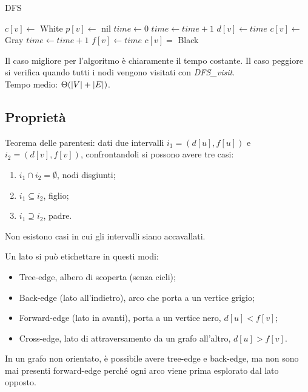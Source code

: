 \begin{algorithm}[H]
	\caption{DFS}
	\begin{algorithmic}
				\State $c[v] \gets $ White
				\State $p[v] \gets $ nil
			\EndFor
			\State $time \gets 0$
					\State {}
				\EndIf
			\EndFor
		\EndFunction
			\State $time \gets time + 1$
			\State $d[v] \gets time$
			\State $c[v] \gets $ Gray
					\State {}
				\EndIf
			\EndFor
			\State $time \gets time + 1$
			\State $f[v] \gets time$
			\State $c[v] = $ Black
		\EndFunction
	\end{algorithmic}
\end{algorithm}

Il caso migliore per l'algoritmo è chiaramente il tempo costante. Il caso peggiore si verifica quando tutti i nodi vengono visitati con \textit{DFS\_visit}. \\
Tempo medio: $\Theta(\left|V\right|+ \left|E\right|)$.

\subsection{Proprietà}
Teorema delle parentesi: dati due intervalli $i_1 = (d[u], f[u])$ e $i_2 = (d[v], f[v])$, confrontandoli si possono avere tre casi:
\begin{enumerate}
	\item $i_1 \cap i_2 = \emptyset$, nodi disgiunti;
	\item $i_1 \subseteq i_2$, figlio;
	\item $i_1 \supseteq i_2$, padre.
\end{enumerate}
Non esistono casi in cui gli intervalli siano accavallati.

Un lato si può etichettare in questi modi:
\begin{itemize}
	\item Tree-edge, albero di scoperta (senza cicli);
	\item Back-edge (lato all'indietro), arco che porta a un vertice grigio;
	\item Forward-edge (lato in avanti), porta a un vertice nero, $d[u] < f[v]$;
	\item Cross-edge, lato di attraversamento da un grafo all'altro, $d[u] > f[v]$. 
\end{itemize}

In un grafo non orientato, è possibile avere tree-edge e back-edge, ma non sono mai presenti forward-edge perché ogni arco viene prima esplorato dal lato opposto. 

